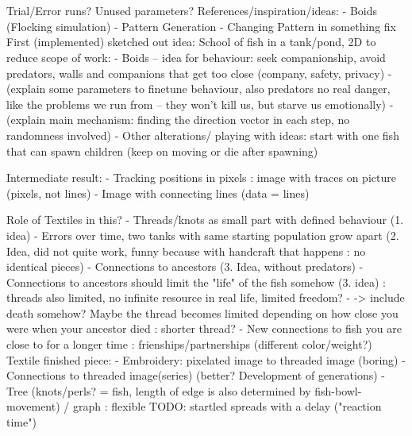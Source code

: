 \documentclass{scrartcl}
\begin{document}
\section{}
\section{}
\subsection{}






Trial/Error runs? Unused parameters?
References/inspiration/ideas:
-	Boids (Flocking simulation)
-	Pattern Generation
-	Changing Pattern in something fix
First (implemented) sketched out idea:
School of fish in a tank/pond, 2D to reduce scope of work:
-	Boids – idea for behaviour: seek companionship, avoid predators, walls and companions that get too close (company, safety, privacy)
-	(explain some parameters to finetune behaviour, also predators no real danger, like the problems we run from – they won’t kill us, but starve us emotionally)
-	(explain main mechanism: finding the direction vector in each step, no randomness involved)
-	Other alterations/ playing with ideas: start with one fish that can spawn children (keep on moving or die after spawning)

Intermediate result:
-	Tracking positions in pixels : image with traces on picture (pixels, not lines)
-	Image with connecting lines (data = lines)

Role of Textiles in this?
-	Threads/knots as small part with defined behaviour (1. idea)
-	Errors over time, two tanks with same starting population grow apart (2. Idea, did not quite work, funny because with handcraft that happens : no identical pieces)
-	Connections to ancestors (3. Idea, without predators)
-	Connections to ancestors should limit the "life" of the  fish somehow (3. idea) : threads also limited, no infinite resource in real life, limited freedom?
-	-> include death somehow? Maybe the thread becomes limited depending on how close you were when your ancestor died : shorter thread?
-	New connections to fish you are close to for a longer time : frienships/partnerships (different color/weight?)
Textile finished piece:
-	Embroidery: pixelated image to threaded image (boring)
-	Connections to threaded image(series) (better? Development of generations)
-	Tree (knots/perls? = fish, length of edge is also determined by fish-bowl-movement) / graph : flexible
TODO: startled spreads with a delay ("reaction time")
\end{document}
